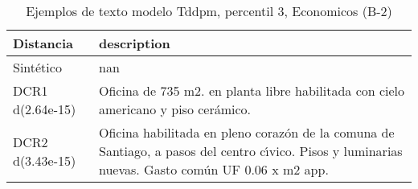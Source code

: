 \begin{table}[H]
\centering
\fontsize{10}{14}\selectfont
\caption{Ejemplos de texto modelo Tddpm, percentil 3, Economicos (B-2)}
\label{table-example-economicos-b-2-tddpm_mlp-3p-text}
\begin{tabular}{|l|m{35em}|}
\hline
\rowcolor[gray]{0.8}
Distancia & description \\
\hline Sintético & nan \\
\hline DCR1 d(2.64e-15) & Oficina de 735 m2.  en planta libre habilitada con cielo americano y piso cer\'amico. \\
\hline DCR2 d(3.43e-15) & Oficina habilitada en pleno coraz\'on de la comuna de Santiago, a pasos del centro c{\'\i}vico.  Pisos y luminarias nuevas.  Gasto com\'un UF 0.06 x m2 app. \\
\hline
\end{tabular}
\end{table}
